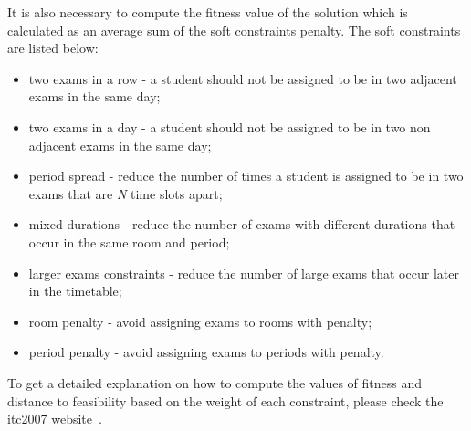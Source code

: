 It is also necessary to compute the fitness value of the solution which is calculated as an average sum of the soft constraints penalty. The soft constraints are listed below:
\begin{itemize}
	\item two exams in a row - a student should not be assigned to be in two adjacent exams in the same day;
	\item two exams in a day - a student should not be assigned to be in two non adjacent exams in the same day;
	\item period spread - reduce the number of times a student is assigned to be in two exams that are \textit{N} time slots apart;
	\item mixed durations - reduce the number of exams with different durations that occur in the same room and period;
	\item larger exams constraints - reduce the number of large exams that occur later in the timetable;
	\item room penalty - avoid assigning exams to rooms with penalty;
	\item period penalty - avoid assigning exams to periods with penalty.
\end{itemize}

To get a detailed explanation on how to compute the values of fitness and distance to feasibility based on the weight of each constraint, please check the \gls{itc2007} website~\cite{McCollum2007}.\\


